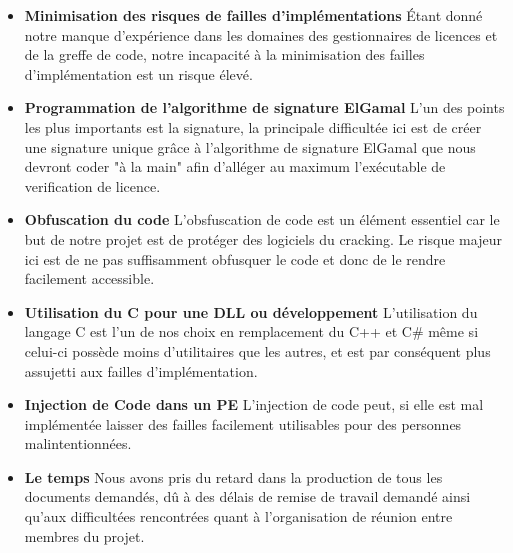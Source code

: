 \begin{itemize}
	\item \textbf{Minimisation des risques de failles d'implémentations} \newline
	Étant donné notre manque d'expérience dans les domaines des gestionnaires de licences
	et de la greffe de code, notre incapacité à la minimisation des failles d'implémentation est un risque élevé.\newline
	
	\item \textbf{Programmation de l'algorithme de signature ElGamal} \newline
	L'un des points les plus importants est la signature, la principale difficultée ici est de créer une signature unique grâce à 
	l'algorithme de signature ElGamal que nous devront coder "à la main" afin d'alléger au maximum l'exécutable de verification de licence.	\newline
	
	\item \textbf{Obfuscation du code} \newline
	L'obsfuscation de code est un élément essentiel car le but de notre projet est de protéger des logiciels du cracking. 
	Le risque majeur ici est de ne pas suffisamment obfusquer le code et donc de le rendre facilement accessible.\newline
	
	\item \textbf{Utilisation du C pour une DLL ou développement} \newline
	L'utilisation du langage C est l'un de nos choix en remplacement du C++ et C\# même si celui-ci possède moins d'utilitaires 
	que les autres, et est par conséquent plus assujetti aux failles d'implémentation.\newline
	
	\item \textbf{Injection de Code dans un PE} \newline
	L'injection de code peut, si elle est mal implémentée laisser des failles facilement utilisables pour des personnes malintentionnées.\newline
	
	\item \textbf{Le temps} \newline
	Nous avons pris du retard dans la production de tous les documents demandés, dû à des délais de remise de travail demandé ainsi qu'aux 
	difficultées rencontrées quant à l'organisation de réunion entre membres du projet.\newline
\end{itemize}

